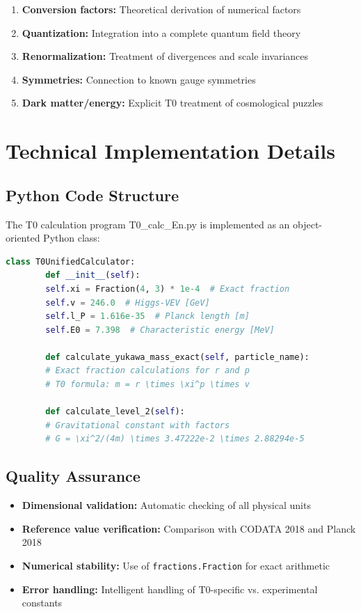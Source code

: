 	\begin{enumerate}
		\item \textbf{Conversion factors:} Theoretical derivation of numerical factors
		\item \textbf{Quantization:} Integration into a complete quantum field theory
		\item \textbf{Renormalization:} Treatment of divergences and scale invariances
		\item \textbf{Symmetries:} Connection to known gauge symmetries
		\item \textbf{Dark matter/energy:} Explicit T0 treatment of cosmological puzzles
	\end{enumerate}
	
	\section{Technical Implementation Details}
	
	\subsection{Python Code Structure}
	
	The T0 calculation program T0\_calc\_En.py is implemented as an object-oriented Python class:
	
	\begin{lstlisting}[language=Python, basicstyle=\small\ttfamily]
		class T0UnifiedCalculator:
		def __init__(self):
		self.xi = Fraction(4, 3) * 1e-4  # Exact fraction
		self.v = 246.0  # Higgs-VEV [GeV]
		self.l_P = 1.616e-35  # Planck length [m]
		self.E0 = 7.398  # Characteristic energy [MeV]
		
		def calculate_yukawa_mass_exact(self, particle_name):
		# Exact fraction calculations for r and p
		# T0 formula: m = r \times \xi^p \times v
		
		def calculate_level_2(self):
		# Gravitational constant with factors
		# G = \xi^2/(4m) \times 3.47222e-2 \times 2.88294e-5
	\end{lstlisting}
	
	\subsection{Quality Assurance}
	
	\begin{itemize}
		\item \textbf{Dimensional validation:} Automatic checking of all physical units
		\item \textbf{Reference value verification:} Comparison with CODATA 2018 and Planck 2018
		\item \textbf{Numerical stability:} Use of \texttt{fractions.Fraction} for exact arithmetic
		\item \textbf{Error handling:} Intelligent handling of T0-specific vs. experimental constants
	\end{itemize}
	
